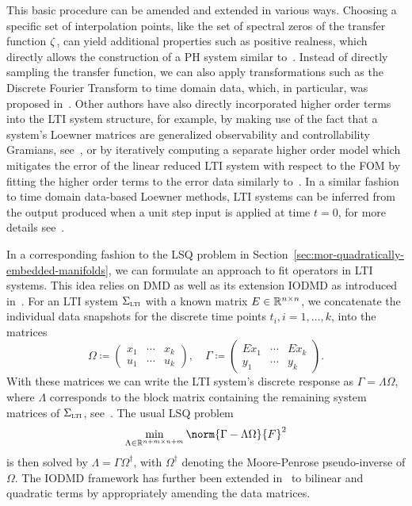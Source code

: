This basic procedure can be amended and extended in various ways.
Choosing a specific set of interpolation points, like the set of spectral zeros of the transfer function $\zeta$, can yield additional properties such as positive realness, which directly allows the construction of a \ac{PH} system similar to~\cite{BGD2020, Poussot2023}.
Instead of directly sampling the transfer function, we can also apply transformations such as the Discrete Fourier Transform to time domain data, which, in particular, was proposed in~\cite{Peherstorfer2017, Cherifi2021}.
Other authors have also directly incorporated higher order terms into the \ac{LTI} system structure, for example, by making use of the fact that a system's Loewner matrices are generalized observability and controllability Gramians, see~\cite{Antoulas2019}, or by iteratively computing a separate higher order model which mitigates the error of the linear reduced \ac{LTI} system with respect to the \ac{FOM} by fitting the higher order terms to the error data similarly to~\cite{GKA2021}.
In a similar fashion to time domain data-based Loewner methods, \ac{LTI} systems can be inferred from the output produced when a unit step input is applied at time $t = 0$, for more details see~\cite{Miller2012}.

In a corresponding fashion to the \ac{LSQ} problem in Section~\ref{sec:mor-quadratically-embedded-manifolds}, we can formulate an approach to fit operators in \ac{LTI} systems.
This idea relies on \ac{DMD} as well as its extension \ac{IODMD} as introduced in~\cite{Annoni2016}.
For an \ac{LTI} system $\Sigma_{\textnormal{\scshape lti}}$ with a known matrix $E \in \mathbb{R}^{n \times n}$, we concatenate the individual data snapshots for the discrete time points $t_i, i = 1, \dots, k$, into the matrices
\begin{equation*}
    \Omega \coloneqq \begin{pmatrix}
        x_1 & \cdots & x_k \\
        u_1 & \cdots & u_k
    \end{pmatrix},\quad \Gamma \coloneqq \begin{pmatrix}
        E \dot{x}_1 & \cdots & E \dot{x}_k \\
        y_1 & \cdots & y_k
    \end{pmatrix}.
\end{equation*}
With these matrices we can write the \ac{LTI} system's discrete response as $\Gamma = \Lambda \Omega$, where $\Lambda$ corresponds to the block matrix containing the remaining system matrices of $\Sigma_{\textnormal{\scshape lti}}$, see~\cite{Heiland2022}.
The usual \ac{LSQ} problem
\begin{equation*}
    \min\limits_{\Lambda \in \bb{R}^{n + m \times n + m}} \norm{\Gamma - \Lambda \Omega}{F}^2
\end{equation*}
is then solved by $\Lambda = \Gamma \Omega^\dagger$, with $\Omega^\dagger$ denoting the Moore-Penrose pseudo-inverse of $\Omega$.
The \ac{IODMD} framework has further been extended in~\cite{Gosea2021} to bilinear and quadratic terms by appropriately amending the data matrices.

